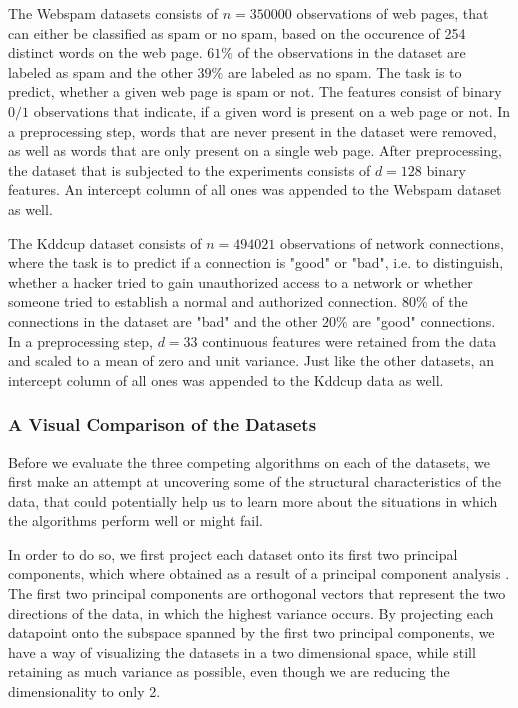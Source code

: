The Webspam datasets consists of $n=350000$ observations of
web pages, that can either be classified as spam or no spam, based
on the occurence of 254 distinct words on the web page.
$61\%$ of the observations in the dataset are labeled as spam
and the other $39\%$ are labeled as no spam. The task is to predict,
whether a given web page is spam or not.
The features consist of binary $0/1$ observations that indicate, if
a given word is present on a web page or not.
In a preprocessing step, words that are never present
in the dataset were removed, as well
as words that are only present on a single web page.
After preprocessing, the dataset that is subjected to the
experiments consists of $d=128$ binary features.
An intercept column of all ones was appended to the Webspam dataset
as well.

The Kddcup dataset consists of $n=494021$ observations of network
connections, where the task is to predict if a connection is
"good" or "bad", i.e. to distinguish, whether a hacker tried
to gain unauthorized
access to a network or whether someone tried to establish a
normal and authorized connection.
$80\%$ of the connections in the dataset are "bad" and the other
$20\%$ are "good" connections.
In a preprocessing step, $d=33$ continuous features
were retained from the data and scaled to a mean of zero and
unit variance. Just like the other datasets, an intercept column
of all ones was appended to the Kddcup data as well.

\subsubsection{A Visual Comparison of the Datasets}

Before we evaluate the three competing algorithms on each of
the datasets, we first make an attempt at uncovering some of
the structural characteristics of the data, that could
potentially help us to learn more about the situations in which
the algorithms perform well or might fail.

In order to do so, we first project each dataset onto
its first two principal components, which where obtained
as a result of a principal component analysis
\cite{principal-components}.
The first two principal components are orthogonal vectors that
represent the two directions of the data,
in which the highest variance occurs.
By projecting each datapoint onto the subspace spanned by
the first two principal components, we have
a way of visualizing the datasets in a two dimensional space, while
still retaining as much variance as possible, even though we are
reducing the dimensionality to only 2.

